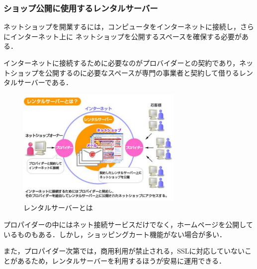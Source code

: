 \subsubsection{ショップ公開に使用するレンタルサーバー}
ネットショップを開業するには，コンピュータをインターネットに接続し，さらにインターネット上に ネットショップを公開するスペースを確保する必要がある．

インターネットに接続するために必要なのがプロバイダーとの契約であり，ネットショップを公開するのに必要なスペースが専門の事業者と契約して借りるレンタルサーバーである．


\begin{figure}[htbp]

\centering
\includegraphics[width=8cm,clip]{rentalserver.pdf}
\caption{レンタルサーバーとは}
\label{rentalserver}

\end{figure} 

プロパイダーの中にはネット接続サービスだけでなく，ホームページを公開しているものもある．しかし，ショッピングカート機能がない場合が多い．

また，プロパイダー次第では，商用利用が禁止される，SSLに対応していないことがあるため，レンタルサーバーを利用するほうが安易に運用できる．

